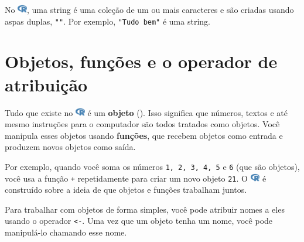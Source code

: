 \documentclass[
  letterpaper,
]{book}
\theoremstyle{definition}
\theoremstyle{plain}
\theoremstyle{remark}
\begin{document}
\begin{tcolorbox}[enhanced jigsaw, coltitle=black, titlerule=0mm, opacitybacktitle=0.6, title=\textcolor{quarto-callout-note-color}{\faInfo}\hspace{0.5em}{Nota}, bottomrule=.15mm, colbacktitle=quarto-callout-note-color!10!white, colback=white, toptitle=1mm, arc=.35mm, left=2mm, breakable, rightrule=.15mm, opacityback=0, colframe=quarto-callout-note-color-frame, leftrule=.75mm, bottomtitle=1mm, toprule=.15mm]

No
\includegraphics[width=1.13em,height=1em]{getting_started_with_r_files/figure-pdf/fa-icon-9b00320707d42527dde67262afb33ded.pdf},
uma string é uma coleção de um ou mais caracteres e são criadas usando
aspas duplas, \texttt{""}. Por exemplo, \texttt{"Tudo\ bem"} é uma
string.

\end{tcolorbox}

\section{Objetos, funções e o operador de
atribuição}\label{objetos-funuxe7uxf5es-e-o-operador-de-atribuiuxe7uxe3o}

Tudo que existe no
\includegraphics[width=1.13em,height=1em]{getting_started_with_r_files/figure-pdf/fa-icon-9b00320707d42527dde67262afb33ded.pdf}
é um \textbf{objeto}
(). Isso
significa que números, textos e até mesmo instruções para o computador
são todos tratados como objetos. Você manipula esses objetos usando
\textbf{funções}, que recebem objetos como entrada e produzem novos
objetos como saída.

Por exemplo, quando você soma os números \texttt{1,\ 2,\ 3,\ 4,\ 5} e
\texttt{6} (que são objetos), você usa a função \texttt{+} repetidamente
para criar um novo objeto \texttt{21}. O
\includegraphics[width=1.13em,height=1em]{getting_started_with_r_files/figure-pdf/fa-icon-9b00320707d42527dde67262afb33ded.pdf}
é construído sobre a ideia de que objetos e funções trabalham juntos.

Para trabalhar com objetos de forma simples, você pode atribuir nomes a
eles usando o operador \texttt{\textless{}-}. Uma vez que um objeto
tenha um nome, você pode manipulá-lo chamando esse nome.
\end{document}
